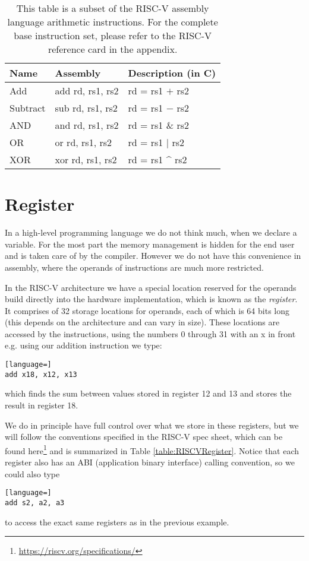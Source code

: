     \begin{table}[h!]
        \centering
        \small
        \begin{tabular}{|l|l|l|}
        	\hline
        	Name     & Assembly         & Description (in C) \\ \hline
        	Add      & add rd, rs1, rs2 & rd = rs1 $+$ rs2   \\
        	Subtract & sub rd, rs1, rs2 & rd = rs1 $-$ rs2   \\
        	AND      & and rd, rs1, rs2 & rd = rs1 \& rs2    \\
        	OR       & or rd, rs1, rs2  & rd = rs1 $|$ rs2   \\
        	XOR      & xor rd, rs1, rs2 & rd = rs1 \^{} rs2  \\ \hline
        \end{tabular}
        \caption{This table is a subset of the RISC-V assembly language arithmetic instructions. For the complete base instruction set, please refer to the RISC-V reference card in the appendix.}
        \label{table:RISCVInstructions}
    \end{table}
\newpage
\section{Register}\label{section:Register}
    In a high-level programming language we do not think much, when we declare a variable. For the most part the memory management is hidden for the end user and is taken care of by the compiler. However we do not have this convenience in assembly, where the operands of instructions are much more restricted. 
    
    In the RISC-V architecture we have a special location reserved for the operands build directly into the hardware implementation, which is known as the \textit{register}. It comprises of 32 storage locations for operands, each of which is 64 bits long (this depends on the architecture and can vary in size). These locations are accessed by the instructions, using the numbers 0 through 31 with an x in front e.g. using our addition instruction we type:
    \begin{lstlisting}[language=]
add x18, x12, x13
    \end{lstlisting}
     which finds the sum between values stored in register 12 and 13 and stores the result in register 18.
     
     We do in principle have full control over what we store in these registers, but we will follow the conventions specified in the RISC-V spec sheet, which can be found here\footnote{\url{https://riscv.org/specifications/}} and is summarized in Table \ref{table:RISCVRegister}. Notice that each register also has an ABI (application binary interface) calling convention, so we could also type
     \begin{lstlisting}[language=]
add s2, a2, a3
     \end{lstlisting}
     to access the exact same registers as in the previous example.
     
